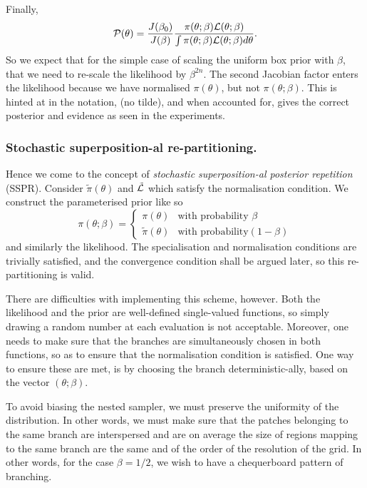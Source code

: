 \documentclass[usenatbib]{mnras}
\begin{document}
Finally, 
\begin{equation}
 {\cal P}(\theta) = \frac{J(\beta_{0})}{J(\beta)} \frac{\pi(\theta; \beta) {\cal L}(\theta; \beta)}{\int \pi(\theta; \beta) {\cal L}(\theta; \beta) d \theta}.
\end{equation}
So we expect that for the simple case of scaling the uniform box
prior with \(\beta\), that we need to re-scale the likelihood by
\(\beta^{2n}\). The second Jacobian factor enters the likelihood because
we have normalised \(\pi(\theta)\), but not \(\pi(\theta; \beta)\). This is hinted at in
the notation, (no tilde), and when accounted for, gives  the correct
posterior and evidence as seen in the experiments. 


\subsubsection{Stochastic superposition-al re-partitioning.}
\label{sec:org2891644}

Hence we come to the concept of \emph{stochastic superposition-al
posterior repetition} (SSPR). Consider \(\tilde{\pi}(\theta)\) and
\({\cal \tilde{L}}\) which satisfy the normalisation
condition. We construct the parameterised prior like so
\begin{equation}
  \pi(\theta; \beta)  = \begin{cases}
	\pi(\theta) & \text{with probability } \beta\\
	\tilde{\pi}(\theta) & \text{with probability} (1- \beta)
	\end{cases}
\end{equation}
and similarly the likelihood.  The specialisation and
normalisation conditions are trivially satisfied, and the
convergence condition shall be argued later, so this
re-partitioning is valid.

There are difficulties with implementing this scheme,
however. Both the likelihood and the prior are well-defined
single-valued functions, so simply drawing a random number at each
evaluation is not acceptable. Moreover, one needs to make sure
that the branches are simultaneously chosen in both functions, so
as to ensure that the normalisation condition is satisfied. One
way to ensure these are met, is by choosing the branch
deterministic-ally, based on the vector \((\theta; \beta)\). 

To avoid biasing the nested sampler, we must preserve the
uniformity of the distribution. In other words, we must make sure
that the patches belonging to the same branch are interspersed and
are on average the size of regions mapping to the same branch are
the same and of the order of the resolution of the grid. In other
words, for the case \(\beta=1/2\), we wish to have a chequerboard
pattern of branching. 
\end{document}
